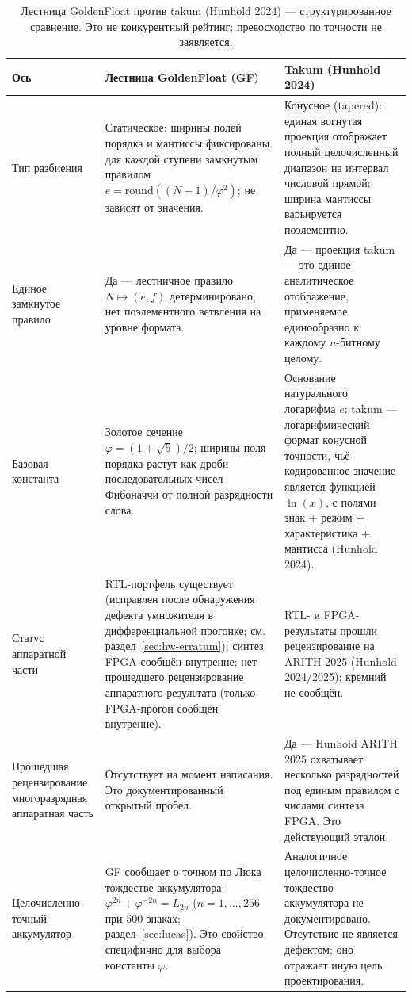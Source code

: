 \documentclass[11pt,a4paper]{article}
\theoremstyle{plain}
\begin{document}
\begin{table}[t]
\centering
\caption{Лестница GoldenFloat против takum (Hunhold 2024) --- структурированное
сравнение. Это не конкурентный рейтинг; превосходство по точности не заявляется.}
\label{tab:gftakum}
\small
\begin{tabularx}{\linewidth}{l X X}
\toprule
Ось & Лестница GoldenFloat (GF) & Takum (Hunhold 2024) \\
\midrule
Тип разбиения & Статическое: ширины полей порядка и мантиссы фиксированы для каждой ступени замкнутым правилом \(e = \mathrm{round}((N-1)/\varphi^{2})\); не зависят от значения. & Конусное (tapered): единая вогнутая проекция отображает полный целочисленный диапазон на интервал числовой прямой; ширина мантиссы варьируется поэлементно. \\
Единое замкнутое правило & Да --- лестничное правило \(N \mapsto (e, f)\) детерминировано; нет поэлементного ветвления на уровне формата. & Да --- проекция takum --- это единое аналитическое отображение, применяемое единообразно к каждому \(n\)-битному целому. \\
Базовая константа & Золотое сечение \(\varphi = (1+\sqrt{5})/2\); ширины поля порядка растут как дроби последовательных чисел Фибоначчи от полной разрядности слова. & Основание натурального логарифма \(e\): takum --- логарифмический формат конусной точности, чьё кодированное значение является функцией \(\ln(x)\), с полями знак + режим + характеристика + мантисса (Hunhold 2024). \\
Статус аппаратной части & RTL-портфель существует (исправлен после обнаружения дефекта умножителя в дифференциальной прогонке; см. раздел~\ref{sec:hw-erratum}); синтез FPGA сообщён внутренне; нет прошедшего рецензирование аппаратного результата (только FPGA-прогон сообщён внутренне). & RTL- и FPGA-результаты прошли рецензирование на ARITH 2025 (Hunhold 2024/2025); кремний не сообщён. \\
Прошедшая рецензирование многоразрядная аппаратная часть & Отсутствует на момент написания. Это документированный открытый пробел. & Да --- Hunhold ARITH 2025 охватывает несколько разрядностей под единым правилом с числами синтеза FPGA. Это действующий эталон. \\
Целочисленно-точный аккумулятор & GF сообщает о точном по Люка тождестве аккумулятора: \(\varphi^{2n} + \varphi^{-2n} = L_{2n}\) (\(n = 1,\dots,256\) при 500 знаках; раздел~\ref{sec:lucas}). Это свойство специфично для выбора константы \(\varphi\). & Аналогичное целочисленно-точное тождество аккумулятора не документировано. Отсутствие не является дефектом; оно отражает иную цель проектирования. \\
\bottomrule
\end{tabularx}
\end{table}
\end{document}
